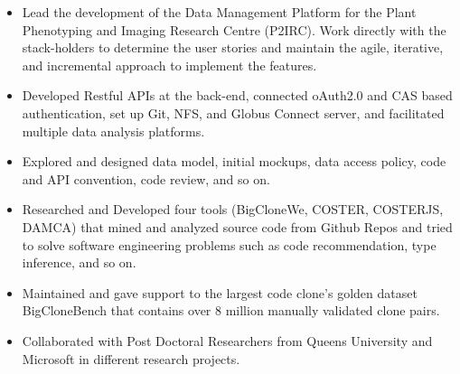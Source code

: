 \documentclass[10pt,a4paper,ragged2e,withhyper]{altacv}
\begin{document}
\begin{paracol}{2}


\begin{itemize}

\item Lead the development of the Data Management Platform for the Plant Phenotyping and Imaging Research Centre (P2IRC). Work directly with the stack-holders to determine the user stories and maintain the agile, iterative, and incremental approach to implement the features.

\item Developed Restful APIs at the back-end, connected oAuth2.0 and CAS based authentication, set up Git, NFS, and Globus Connect server, and facilitated multiple data analysis platforms.

\item Explored and designed data model, initial mockups, data access policy, code and API convention, code review, and so on.

\end{itemize}

\divider

\begin{itemize}

\item Researched and Developed four tools (BigCloneWe, COSTER, COSTERJS, DAMCA) that mined and analyzed source code from Github Repos and tried to solve software engineering problems such as code recommendation, type inference, and so on.

\item Maintained and gave support to the largest code clone's golden dataset BigCloneBench that contains over 8 million manually validated clone pairs.
\item Collaborated with Post Doctoral Researchers from Queens University and Microsoft in different research projects.
\end{itemize}

\divider

\begin{itemize}


\end{itemize}
\end{paracol}
\end{document}
